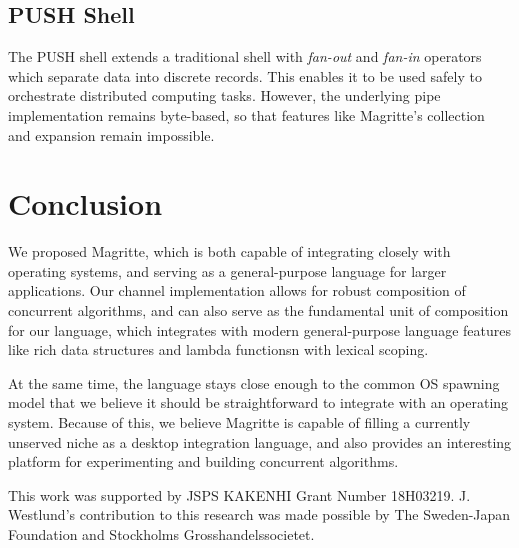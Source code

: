 \ifsigpro{ \documentclass[english,PRO]{ipsj} }
\begin{document}
\subsection{PUSH Shell}\noindent
The PUSH shell\cite{push} extends a traditional shell with \emph{fan-out} and \emph{fan-in} operators which separate data into discrete records. This enables it to be used safely to orchestrate distributed computing tasks. However, the underlying pipe implementation remains byte-based, so that features like Magritte's collection and expansion remain impossible.

\section{Conclusion}\label{conclusion} \noindent
We proposed Magritte, which is both capable of integrating closely with operating systems, and serving as a general-purpose language for larger applications.  Our channel implementation allows for robust composition of concurrent algorithms, and can also serve as the fundamental unit of composition for our language, which integrates with modern general-purpose language features like rich data structures and lambda functionsn with lexical scoping.

At the same time, the language stays close enough to the common OS spawning model that we believe it should be straightforward to integrate with an operating system. Because of this, we believe Magritte is capable of filling a currently unserved niche as a desktop integration language, and also provides an interesting platform for experimenting and building concurrent algorithms.

\ifsigpro{
\newenvironment{acks}{\begin{acknowledgment}}{%
\end{acknowledgment}\ignorespacesafterend
}
}

\begin{acks}
This work was supported by JSPS KAKENHI Grant Number 18H03219.  J. Westlund's contribution to this research was made possible by
The Sweden-Japan Foundation and Stockholms Grosshandelssocietet.
\end{acks}

\ifsigpro{}
\ifsigplan{}

\end{document}

